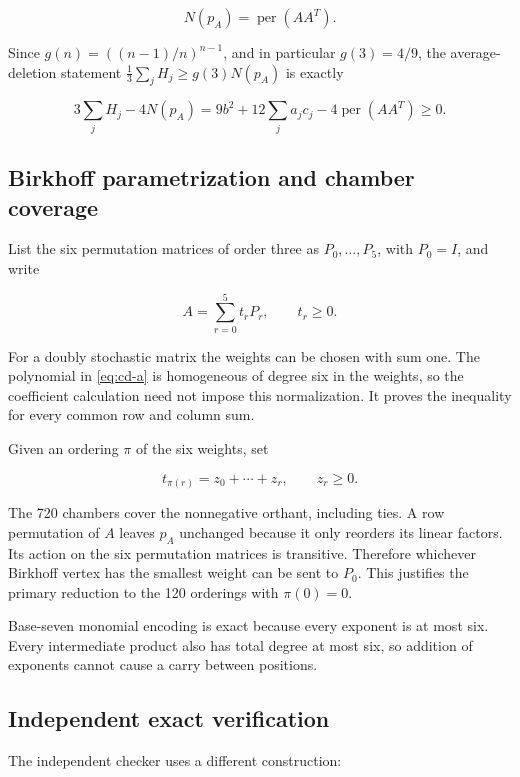 \documentclass[11pt,a4paper]{article}
\theoremstyle{definition}
\theoremstyle{remark}
\begin{document}
\[
N(p_A)=\operatorname{per}(AA^T).
\]

Since \(g(n)=((n-1)/n)^{n-1}\), and in particular \(g(3)=4/9\), the average-deletion statement
\(\frac13\sum_jH_j\ge g(3)N(p_A)\) is exactly

\begin{equation}\label{eq:cd-a}
3\sum_jH_j-4N(p_A)
=9b^2+12\sum_ja_jc_j-4\operatorname{per}(AA^T)\ge0.
\end{equation}


\subsection{Birkhoff parametrization and chamber
coverage}\label{deletion-birkhoff-parametrization-and-chamber-coverage}

List the six permutation matrices of order three as \(P_0,\ldots,P_5\),
with \(P_0=I\), and write

\[
A=\sum_{r=0}^5t_rP_r,\qquad t_r\ge0.
\]

For a doubly stochastic matrix the weights can be chosen with sum one.
The polynomial in \eqref{eq:cd-a} is homogeneous of degree six in the weights, so
the coefficient calculation need not impose this normalization. It
proves the inequality for every common row and column sum.

Given an ordering \(\pi\) of the six weights, set

\[
t_{\pi(r)}=z_0+\cdots+z_r,\qquad z_r\ge0.
\]

The 720 chambers cover the nonnegative orthant, including ties. A row
permutation of \(A\) leaves \(p_A\) unchanged because it only reorders
its linear factors. Its action on the six permutation matrices is
transitive. Therefore whichever Birkhoff vertex has the smallest weight
can be sent to \(P_0\). This justifies the primary reduction to the 120
orderings with \(\pi(0)=0\).

Base-seven monomial encoding is exact because every exponent is at most six.
Every intermediate product also has total degree at most six, so addition of exponents cannot cause a carry between positions.

\subsection{Independent exact
verification}\label{deletion-independent-exact-verification}

The independent checker uses a different construction:
\end{document}
